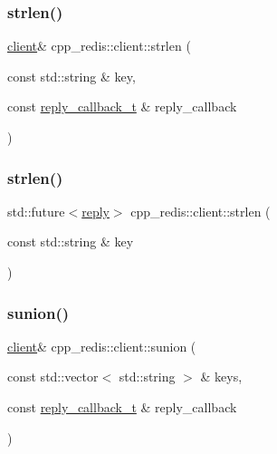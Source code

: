 \mbox{\label{classcpp__redis_1_1client_ab7dab44434cee5e29e2bdf3c3be1df94}} 
\subsubsection{\texorpdfstring{strlen()}{strlen()}\hspace{0.1cm}{\footnotesize\ttfamily [1/2]}}
{\footnotesize\ttfamily \hyperlink{classcpp__redis_1_1client}{client}\& cpp\+\_\+redis\+::client\+::strlen (\begin{DoxyParamCaption}\item[{const std\+::string \&}]{key,  }\item[{const \hyperlink{classcpp__redis_1_1client_a061a1140d36d2eaeda82b09a0bb3f9f2}{reply\+\_\+callback\+\_\+t} \&}]{reply\+\_\+callback }\end{DoxyParamCaption})}

\mbox{\label{classcpp__redis_1_1client_a6b9f2a3a8952de874a9a6e1555c85195}} 
\subsubsection{\texorpdfstring{strlen()}{strlen()}\hspace{0.1cm}{\footnotesize\ttfamily [2/2]}}
{\footnotesize\ttfamily std\+::future$<$\hyperlink{classcpp__redis_1_1reply}{reply}$>$ cpp\+\_\+redis\+::client\+::strlen (\begin{DoxyParamCaption}\item[{const std\+::string \&}]{key }\end{DoxyParamCaption})}

\mbox{\label{classcpp__redis_1_1client_a7128cdf97d9f768b117bab5843059fe1}} 
\subsubsection{\texorpdfstring{sunion()}{sunion()}\hspace{0.1cm}{\footnotesize\ttfamily [1/2]}}
{\footnotesize\ttfamily \hyperlink{classcpp__redis_1_1client}{client}\& cpp\+\_\+redis\+::client\+::sunion (\begin{DoxyParamCaption}\item[{const std\+::vector$<$ std\+::string $>$ \&}]{keys,  }\item[{const \hyperlink{classcpp__redis_1_1client_a061a1140d36d2eaeda82b09a0bb3f9f2}{reply\+\_\+callback\+\_\+t} \&}]{reply\+\_\+callback }\end{DoxyParamCaption})}

